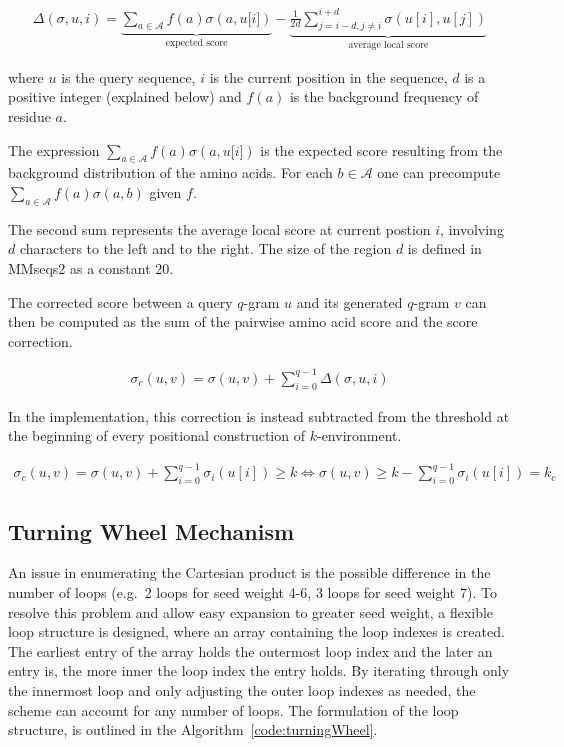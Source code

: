 \documentclass[twoside,a4paper,bsc]{master}
\newcommand{\Qgram}[1]{\(#1\)-gram}
\newcommand{\Subchar}[2]{#1\lbrack #2\rbrack}
\newcommand{\Alpha}[0]{\mathcal{A}}
\begin{document}
\begin{align}
\Delta(\sigma,u,i) =
\underbrace{\sum_{a\in \Alpha}f(a)\sigma(a,\Subchar{u}{i})}_{\text{expected score}}-
\underbrace{\frac{1}{2d}\sum_{j=i-d,j\neq i}^{i+d}\sigma (u[i],u[j])}_{\text{average local score}}
\end{align}

where \(u\) is the query sequence, \(i\) is the current position in the
sequence, \(d\) is a positive integer (explained below)
and \(f(a)\) is the background frequency of residue \(a\).

The expression
\(\sum_{a\in \Alpha}f(a)\sigma(a,\Subchar{u}{i})\) is
the expected score resulting from the
background distribution of the amino acids. For each \(b\in\Alpha\) one can
precompute \(\sum_{a\in \Alpha}f(a)\sigma(a,b)\) given \(f\).

The second sum represents the average local score at current postion \(i\), 
involving \(d\) characters to the left and to the right. The size of the region 
\(d\) is defined in MMseqs2 as a constant 20.

The corrected score between a query \Qgram{q} \(u\) and its generated
\Qgram{q} \(v\) can then be computed as the sum of the pairwise amino acid
score and the score correction.

\begin{align}
\sigma_c(u,v) = \sigma (u,v) + \sum_{i=0}^{q-1} \Delta(\sigma,u,i)
\end{align}

In the implementation, this correction is instead subtracted from the
threshold at the beginning of every positional construction of 
\(k\)-environment.

\begin{align}
\sigma_c(u,v) = \sigma (u,v) + \sum_{i=0}^{q-1} \sigma_i(u[i]) \geq k
\Leftrightarrow \sigma (u,v) \geq k - \sum_{i=0}^{q-1} \sigma_i(u[i]) =
k_{c}
\end{align}

\subsection{Turning Wheel Mechanism}
An issue in enumerating the Cartesian product is the possible difference in
the number of loops (e.g.\ 2 loops for seed weight 4-6, 3 loops for seed weight
7). To resolve this problem and allow easy expansion to greater seed
weight, a flexible loop structure is designed, where an array containing
the loop indexes is created. The earliest entry of the array holds the
outermost loop index and the later an entry is, the more inner the loop
index the entry holds. By iterating through only the innermost loop and
only adjusting the outer loop indexes as needed, the scheme can account for
any number of loops.
The formulation of the loop structure, is outlined in the
Algorithm~\ref{code:turningWheel}.
\end{document}
